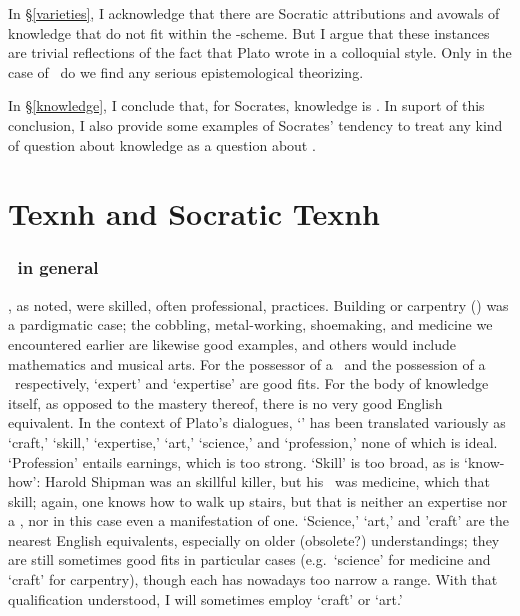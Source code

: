 \documentclass[11pt,letterpaper,oneside]{amsart} %
\begin{document}
In \S\ref{varieties}, I acknowledge that there are Socratic attributions and avowals of knowledge that do not fit within the \techne-scheme. But I argue that these instances are trivial reflections of the fact that Plato wrote in a colloquial style. Only in the case of \techne\ do we find any serious epistemological theorizing.

In \S\ref{knowledge}, I conclude that, for Socrates, knowledge is \techne. In suport of this conclusion, I also provide some examples of Socrates' tendency to treat any kind of question about knowledge as a question about \techne.



\section{Texnh and Socratic Texnh}
\label{distinct}

 
\subsubsection*{\techne\ in general}

\technai, as noted, were skilled, often professional, practices. Building or carpentry (\tektonia) was a pardigmatic case; the cobbling, metal-working, shoemaking, and medicine we encountered earlier are likewise good examples, and others would include mathematics and musical arts. For the possessor of a \techne\ and the possession of a \techne\ respectively, `expert' and `expertise' are good fits. For the body of knowledge itself, as opposed to the mastery thereof, there is no very good English equivalent. In the context of Plato's dialogues, `\techne' has been translated variously as `craft,' `skill,' `expertise,' `art,' `science,' and `profession,' none of which is ideal. `Profession' entails earnings, which is too strong. `Skill' is too broad, as is `know-how': Harold Shipman was an skillful killer, but his \techne\ was medicine, which  that skill; again, one knows how to walk up stairs, but that is neither an expertise nor a \techne, nor in this case even a manifestation of one. `Science,' `art,' and 'craft' are the nearest English equivalents, especially on older (obsolete?) understandings; they are still sometimes good fits in particular cases (e.g.\ `science' for medicine and `craft' for carpentry), though each has nowadays too narrow a range. With that qualification understood, I will sometimes employ `craft' or `art.'
\end{document}
